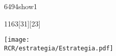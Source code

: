 \begin{NuevaPagina}{64}{94}{show1}
	\begin{NuevoParrafo}{11}{63}[31][23]
		\begin{Marco}[\LineaSupC][\LineaInfC][\LineaIzqC][\LineaDerC][CBlanco]
			\subseccionC{\PVEtg}%
			\centering\texttt{[image: \\RCR/estrategia/Estrategia.pdf]}		
		\end{Marco}
	\end{NuevoParrafo}	


\end{NuevaPagina}
